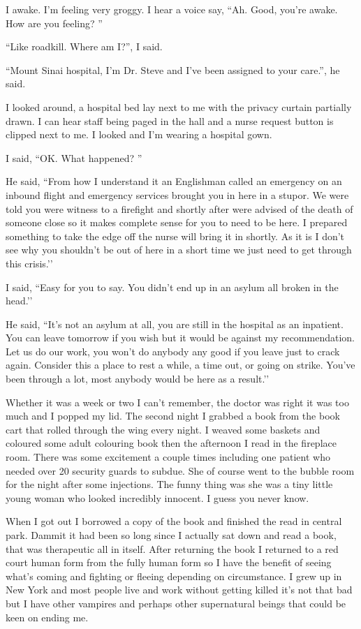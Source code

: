 ﻿I awake. I'm feeling very groggy. I hear a voice say, ``Ah. Good, you're awake. How are you feeling? ''

``Like roadkill. Where am I?'', I said.

``Mount Sinai hospital, I'm Dr. Steve and I've been assigned to your care.'', he said.

I looked around, a hospital bed lay next to me with the privacy curtain partially drawn. I can hear staff being paged in the hall and a nurse request button is clipped next to me. I looked and I'm wearing a hospital gown.

I said, ``OK. What happened? ''

He said, ``From how I understand it an Englishman called an emergency on an inbound flight and emergency services brought you in here in a stupor. We were told you were witness to a firefight and shortly after were advised of the death of someone close so it makes complete sense for you to need to be here. I prepared something to take the edge off the nurse will bring it in shortly. As it is I don’t see why you shouldn’t be out of here in a short time we just need to get through this crisis.’’

I said, ``Easy for you to say. You didn’t end up in an asylum all broken in the head.’’

He said, ``It’s not an asylum at all, you are still in the hospital as an inpatient. You can leave tomorrow if you wish but it would be against my recommendation. Let us do our work, you won’t do anybody any good if you leave just to crack again. Consider this a place to rest a while, a time out, or going on strike. You’ve been through a lot, most anybody would be here as a result.’’

Whether it was a week or two I can’t remember, the doctor was right it was too much and I popped my lid. The second night I grabbed a book from the book cart that rolled through the wing every night. I weaved some baskets and coloured some adult colouring book then the afternoon I read in the fireplace room. There was some excitement a couple times including one patient who needed over 20 security guards to subdue. She of course went to the bubble room for the night after some injections. The funny thing was she was a tiny little young woman who looked incredibly innocent. I guess you never know.

When I got out I borrowed a copy of the book and finished the read in central park. Dammit it had been so long since I actually sat down and read a book, that was therapeutic all in itself. After returning the book I returned to a red court human form from the fully human form so I have the benefit of seeing what’s coming and fighting or fleeing depending on circumstance. I grew up in New York and most people live and work without getting killed it’s not that bad but I have other vampires and perhaps other supernatural beings that could be keen on ending me.

